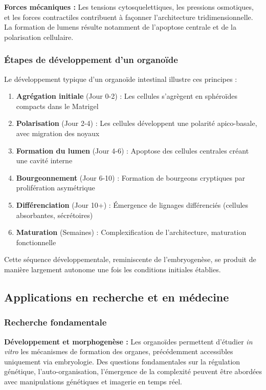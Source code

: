 \textbf{Forces mécaniques :}
Les tensions cytosquelettiques, les pressions osmotiques, et les forces contractiles contribuent à façonner l'architecture tridimensionnelle. La formation de lumens résulte notamment de l'apoptose centrale et de la polarisation cellulaire.

\subsubsection{Étapes de développement d'un organoïde}

Le développement typique d'un organoïde intestinal illustre ces principes :
\begin{enumerate}
    \item \textbf{Agrégation initiale} (Jour 0-2) : Les cellules s'agrègent en sphéroïdes compacts dans le Matrigel
    \item \textbf{Polarisation} (Jour 2-4) : Les cellules développent une polarité apico-basale, avec migration des noyaux
    \item \textbf{Formation du lumen} (Jour 4-6) : Apoptose des cellules centrales créant une cavité interne
    \item \textbf{Bourgeonnement} (Jour 6-10) : Formation de bourgeons cryptiques par prolifération asymétrique
    \item \textbf{Différenciation} (Jour 10+) : Émergence de lignages différenciés (cellules absorbantes, sécrétoires)
    \item \textbf{Maturation} (Semaines) : Complexification de l'architecture, maturation fonctionnelle
\end{enumerate}

Cette séquence développementale, reminiscente de l'embryogenèse, se produit de manière largement autonome une fois les conditions initiales établies.

\subsection{Applications en recherche et en médecine}

\subsubsection{Recherche fondamentale}

\textbf{Développement et morphogenèse :}
Les organoïdes permettent d'étudier \textit{in vitro} les mécanismes de formation des organes, précédemment accessibles uniquement via embryologie. Des questions fondamentales sur la régulation génétique, l'auto-organisation, l'émergence de la complexité peuvent être abordées avec manipulations génétiques et imagerie en temps réel.

